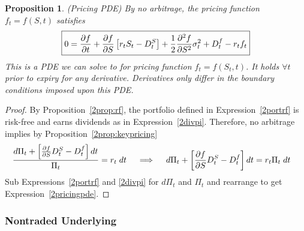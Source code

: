 \documentclass[12pt]{article}
\theoremstyle{plain}
\newtheorem{prop}[thm]{Proposition}
\theoremstyle{definition}
\theoremstyle{remark}
\begin{document}
\begin{prop}\emph{(Pricing PDE)}
\label{2pdetraded}
By no arbitrage, the pricing function $f_t=f(S,t)$ satisfies
\begin{align}
  \boxed{%
  0
  =
  \frac{\partial f}{\partial t}
  +
  \frac{\partial f}{\partial S}
  \left[
  r_t
  S_t
  - D_t^S
  \right]
  +
  \frac{1}{2}
  \frac{\partial^2 f}{\partial S^2}
  \sigma^2_t
  +
  D_t^f
  -
  r_t
  f_t
  }
  \label{2pricingpde}
\end{align}
This is a PDE we can solve to for pricing function $f_t=f(S_t,t)$. It
holds $\forall t$ prior to expiry for \emph{any} derivative.
Derivatives only differ in the boundary conditions imposed upon this
PDE.
\end{prop}
\begin{proof}
By Proposition~\ref{2prop:rf}, the portfolio defined in
Expression~\ref{2portrf} is risk-free and earns dividends as in
Expression~\ref{2divpi}.
Therefore, no arbitrage implies by Proposition~\ref{2prop:keypricing}
\begin{align*}
  \frac{%
    d\Pi_t +
    \left[
      \frac{\partial f}{\partial S} D_t^S - D_t^f
    \right]dt
  }{\Pi_t}
  &=
  r_t\;dt
  \quad\implies\quad
  d\Pi_t
  +
  \left[
    \frac{\partial f}{\partial S} D_t^S - D_t^f
  \right]dt
  =
  r_t\Pi_t\;dt
\end{align*}
Sub Expressions~\ref{2portrf} and \ref{2divpi} for $d\Pi_t$ and $\Pi_t$
and rearrange to get Expression~\ref{2pricingpde}.
\end{proof}



\clearpage
\subsubsection{Nontraded Underlying}
\end{document}
